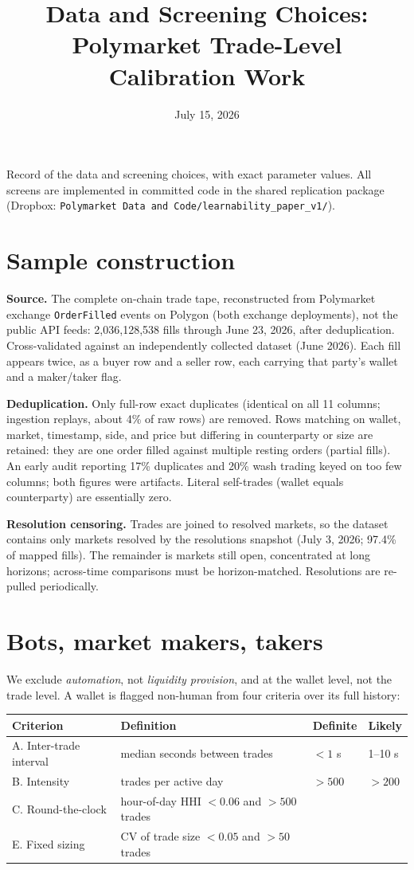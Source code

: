 \documentclass[11pt]{article}
\title{Data and Screening Choices:\\ Polymarket Trade-Level Calibration Work}
\author{}
\date{July 15, 2026}
\begin{document}
\maketitle

Record of the data and screening choices, with exact parameter values. All
screens are implemented in committed code in the shared replication package
(Dropbox: \texttt{Polymarket Data and Code/learnability\_paper\_v1/}).

\section{Sample construction}

\textbf{Source.} The complete on-chain trade tape, reconstructed from
Polymarket exchange \texttt{OrderFilled} events on Polygon (both exchange
deployments), not the public API feeds: 2{,}036{,}128{,}538 fills through
June 23, 2026, after deduplication. Cross-validated against an independently
collected dataset (June 2026). Each fill appears twice, as a buyer row and a
seller row, each carrying that party's wallet and a maker/taker flag.

\textbf{Deduplication.} Only full-row exact duplicates (identical on all 11
columns; ingestion replays, about 4\% of raw rows) are removed. Rows matching
on wallet, market, timestamp, side, and price but differing in counterparty or
size are retained: they are one order filled against multiple resting orders
(partial fills). An early audit reporting 17\% duplicates and 20\% wash
trading keyed on too few columns; both figures were artifacts. Literal
self-trades (wallet equals counterparty) are essentially zero.

\textbf{Resolution censoring.} Trades are joined to resolved markets, so the
dataset contains only markets resolved by the resolutions snapshot (July 3,
2026; 97.4\% of mapped fills). The remainder is markets still open,
concentrated at long horizons; across-time comparisons must be
horizon-matched. Resolutions are re-pulled periodically.

\section{Bots, market makers, takers}

We exclude \emph{automation}, not \emph{liquidity provision}, and at the
wallet level, not the trade level. A wallet is flagged non-human from four
criteria over its full history:

\begin{center}
\begin{tabular}{llll}
\hline
Criterion & Definition & Definite & Likely \\
\hline
A. Inter-trade interval & median seconds between trades & $<1$ s & 1--10 s \\
B. Intensity & trades per active day & $>500$ & $>200$ \\
C. Round-the-clock & hour-of-day HHI $<0.06$ and $>500$ trades & & \\
E. Fixed sizing & CV of trade size $<0.05$ and $>50$ trades & & \\
\hline
\end{tabular}
\end{center}
\end{document}
